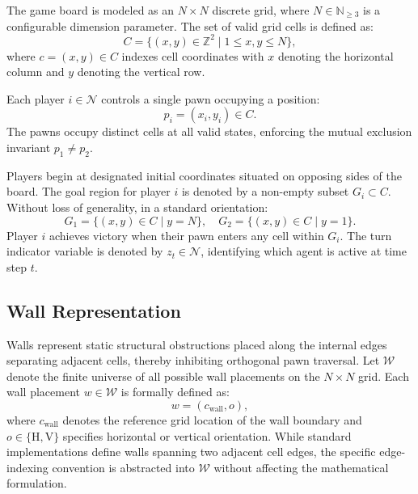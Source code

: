 \documentclass{article}
\begin{document}
The game board is modeled as an $N \times N$ discrete grid, where $N \in \mathbb{N}_{\ge 3}$ is a configurable dimension parameter. The set of valid grid cells is defined as:
\begin{equation}
C = \big\{ (x, y) \in \mathbb{Z}^2 \;\big|\; 1 \le x, y \le N \big\},
\end{equation}
where $c = (x, y) \in C$ indexes cell coordinates with $x$ denoting the horizontal column and $y$ denoting the vertical row.

Each player $i \in \mathcal{N}$ controls a single pawn occupying a position:
\begin{equation}
p_i = (x_i, y_i) \in C.
\end{equation}
The pawns occupy distinct cells at all valid states, enforcing the mutual exclusion invariant $p_1 \ne p_2$. 

Players begin at designated initial coordinates situated on opposing sides of the board. The goal region for player $i$ is denoted by a non-empty subset $G_i \subset C$. Without loss of generality, in a standard orientation:
\begin{equation}
G_1 = \big\{ (x, y) \in C \;\big|\; y = N \big\}, \quad G_2 = \big\{ (x, y) \in C \;\big|\; y = 1 \big\}.
\end{equation}
Player $i$ achieves victory when their pawn enters any cell within $G_i$. The turn indicator variable is denoted by $z_t \in \mathcal{N}$, identifying which agent is active at time step $t$.

\subsection{Wall Representation}
\label{subsec:wall_representation}

Walls represent static structural obstructions placed along the internal edges separating adjacent cells, thereby inhibiting orthogonal pawn traversal. Let $\mathcal{W}$ denote the finite universe of all possible wall placements on the $N \times N$ grid. Each wall placement $w \in \mathcal{W}$ is formally defined as:
\begin{equation}
w = (c_{\text{wall}}, o),
\end{equation}
where $c_{\text{wall}}$ denotes the reference grid location of the wall boundary and $o \in \{\text{H}, \text{V}\}$ specifies horizontal or vertical orientation. While standard implementations define walls spanning two adjacent cell edges, the specific edge-indexing convention is abstracted into $\mathcal{W}$ without affecting the mathematical formulation.
\end{document}
